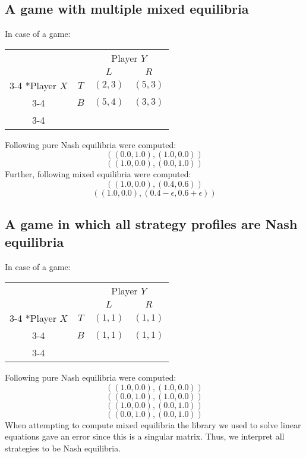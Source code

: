 \documentclass{article}
\begin{document}
\subsection{A game with multiple mixed equilibria}
In case of a game:
\begin{table}[H]
    \setlength{\extrarowheight}{2pt}
    \begin{tabular}{cc|c|c|}
      & \multicolumn{1}{c}{} & \multicolumn{2}{c}{Player $Y$}\\
      & \multicolumn{1}{c}{} & \multicolumn{1}{c}{$L$}  & \multicolumn{1}{c}{$R$} \\\cline{3-4}
      \multirow{2}*{Player $X$}  & $T$ & $(2,3)$ & $(5,3)$ \\\cline{3-4}
      & $B$ & $(5,4)$ & $(3,3)$ \\\cline{3-4}
    \end{tabular}
  \end{table}
  Following pure Nash equilibria were computed:
    $$((0.0,1.0),(1.0,0.0))$$
	$$((1.0,0.0),(0.0,1.0))$$
  Further, following mixed equilibria were computed:
  $$((1.0,0.0),(0.4,0.6))$$
  $$((1.0,0.0),(0.4-\epsilon,0.6+\epsilon))$$


\subsection{A game in which all strategy profiles are Nash equilibria}
In case of a game:
\begin{table}[H]
    \setlength{\extrarowheight}{2pt}
    \begin{tabular}{cc|c|c|}
      & \multicolumn{1}{c}{} & \multicolumn{2}{c}{Player $Y$}\\
      & \multicolumn{1}{c}{} & \multicolumn{1}{c}{$L$}  & \multicolumn{1}{c}{$R$} \\\cline{3-4}
      \multirow{2}*{Player $X$}  & $T$ & $(1,1)$ & $(1,1)$ \\\cline{3-4}
      & $B$ & $(1,1)$ & $(1,1)$ \\\cline{3-4}
    \end{tabular}
  \end{table}
  Following pure Nash equilibria were computed:
  $$((1.0,0.0),(1.0,0.0))$$
$$((0.0,1.0),(1.0,0.0))$$
$$((1.0,0.0),(0.0,1.0))$$
$$((0.0,1.0),(0.0,1.0))$$
When attempting to compute mixed equilibria the library we used to solve linear equations gave an error since this is a singular matrix. Thus, we interpret all strategies to be Nash equilibria.
\end{document}
